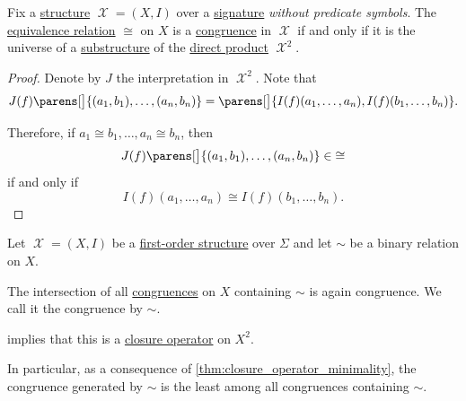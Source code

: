 \begin{proposition}\label{thm:fol_congruence_as_substructure}
  Fix a \hyperref[def:fol_structure]{structure} \( \mscrX = (X, I) \) over a \hyperref[def:fol_signature]{signature} \emph{without predicate symbols}. The \hyperref[def:equivalence_relation]{equivalence relation} \( {\cong} \) on \( X \) is a \hyperref[def:fol_congruence]{congruence} in \( \mscrX \) if and only if it is the universe of a \hyperref[def:fol_substructure]{substructure} of the \hyperref[def:fol_direct_product]{direct product} \( \mscrX^2 \).
\end{proposition}
\begin{proof}
  Denote by \( J \) the interpretation in \( \mscrX^2 \). Note that
  \begin{equation*}
    J(f)\parens[\big]{ (a_1, b_1), \ldots, (a_n, b_n) }
    =
    \parens[\big]{ I(f)(a_1, \ldots, a_n), I(f)(b_1, \ldots, b_n) }.
  \end{equation*}

  Therefore, if \( a_1 \cong b_1, \ldots, a_n \cong b_n \), then
  \begin{equation*}
    J(f)\parens[\big]{ (a_1, b_1), \ldots, (a_n, b_n) } \in {\cong}
  \end{equation*}
  if and only if
  \begin{equation*}
    I(f)(a_1, \ldots, a_n) \cong I(f)(b_1, \ldots, b_n).
  \end{equation*}
\end{proof}

\begin{definition}\label{def:fol_generated_congruence}\mimprovised
  Let \( \mscrX = (X, I) \) be a \hyperref[def:fol_structure]{first-order structure} over \( \Sigma \) and let \( {\sim} \) be a binary relation on \( X \).

  The intersection of all \hyperref[def:fol_congruence]{congruences} on \( X \) containing \( {\sim} \) is again congruence. We call it the congruence  by \( {\sim} \).
\end{definition}
\begin{comments}
  \item {} implies that this is a \hyperref[def:abstract_closure_operator]{closure operator} on \( X^2 \).

  In particular, as a consequence of \cref{thm:closure_operator_minimality}, the congruence generated by \( {\sim} \) is the least among all congruences containing \( {\sim} \).
\end{comments}

